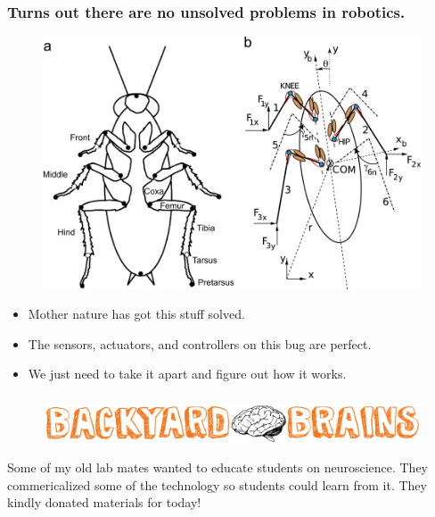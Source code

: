 \documentclass[compress]{beamer}
\begin{document}
\begin{frame}
  \frametitle{Turns out there are no unsolved problems in robotics.}
  \begin{figure}
    \includegraphics[width=0.6\linewidth]{roach.jpg}
  \end{figure}     
  \begin{itemize}
    \item Mother nature has got this stuff solved. 
    \item The sensors, actuators, and controllers on this bug are perfect.
    \item We just need to take it apart and figure out how it works. 
  \end{itemize}
\end{frame}
\begin{frame}
  \frametitle{}
  \begin{figure}
    \includegraphics[width=0.6\linewidth]{byb.png}
  \end{figure}     
  Some of my old lab mates wanted to educate students on neuroscience. They commericalized some of the technology so students could learn from it. They kindly donated materials for today!
\end{frame}
\end{document}
